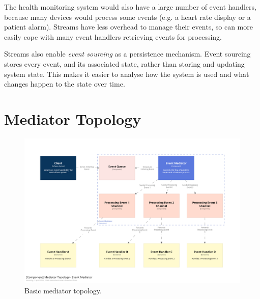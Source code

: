 The health monitoring system would also have a large number of event handlers, because many devices would process some events
(e.g. a heart rate display or a patient alarm).
Streams have less overhead to manage their events, so can more easily cope with many event handlers retrieving events for processing. 

Streams also enable \emph{event sourcing} as a persistence mechanism.
Event sourcing stores every event, and its associated state, rather than storing and updating system state.
This makes it easier to analyse how the system is used and what changes happen to the state over time.

%
%


\section{Mediator Topology}

\begin{figure}[h!]
    \begin{adjustwidth}{-10mm}{-10mm}
        \centering
        \includegraphics[trim=195 195 195 195,clip,width=0.97\paperwidth]{diagrams/mediator-components.png}
    \end{adjustwidth}
    \caption{Basic mediator topology.}
    \label{fig:mediator-components}
\end{figure}

